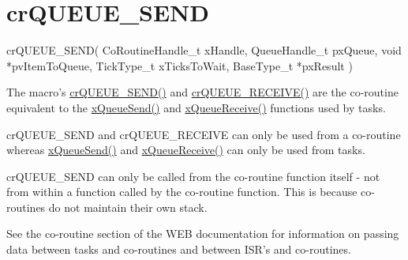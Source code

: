 \hypertarget{group__crQUEUE__SEND}{\section{cr\-Q\-U\-E\-U\-E\-\_\-\-S\-E\-N\-D}
\label{group__crQUEUE__SEND}
}

\begin{DoxyPre}
 crQUEUE\_SEND(
                  CoRoutineHandle\_t xHandle,
                  QueueHandle\_t pxQueue,
                  void *pvItemToQueue,
                  TickType\_t xTicksToWait,
                  BaseType\_t *pxResult
             )\end{DoxyPre}


The macro's \hyperlink{croutine_8h_a26af3d36f22a04168eebdf5b08465d6e}{cr\-Q\-U\-E\-U\-E\-\_\-\-S\-E\-N\-D()} and \hyperlink{croutine_8h_a586d57fd9a3e2aa5ae66484ed3be36c9}{cr\-Q\-U\-E\-U\-E\-\_\-\-R\-E\-C\-E\-I\-V\-E()} are the co-\/routine equivalent to the \hyperlink{queue_8h_af7eb49d3249351176992950d9185abe9}{x\-Queue\-Send()} and \hyperlink{queue_8h_af1549eac0e7f05694a59a0b967c80be3}{x\-Queue\-Receive()} functions used by tasks.

cr\-Q\-U\-E\-U\-E\-\_\-\-S\-E\-N\-D and cr\-Q\-U\-E\-U\-E\-\_\-\-R\-E\-C\-E\-I\-V\-E can only be used from a co-\/routine whereas \hyperlink{queue_8h_af7eb49d3249351176992950d9185abe9}{x\-Queue\-Send()} and \hyperlink{queue_8h_af1549eac0e7f05694a59a0b967c80be3}{x\-Queue\-Receive()} can only be used from tasks.

cr\-Q\-U\-E\-U\-E\-\_\-\-S\-E\-N\-D can only be called from the co-\/routine function itself -\/ not from within a function called by the co-\/routine function. This is because co-\/routines do not maintain their own stack.

See the co-\/routine section of the W\-E\-B documentation for information on passing data between tasks and co-\/routines and between I\-S\-R's and co-\/routines.


